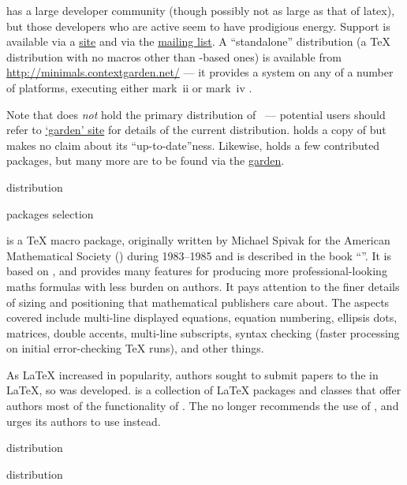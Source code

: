 \context{} has a large developer community (though possibly not as
large as that of latex{}), but those developers who are active seem to have
prodigious energy.  Support is available via a %
\href{http://wiki.contextgarden.net/Main_Page}{ site} and via the
\href{http://www.ntg.nl/mailman/listinfo/ntg-context}{mailing list}.
A ``standalone'' distribution (a \TeX{} distribution with no macros
other than \context{}-based ones) is available from
\url{http://minimals.contextgarden.net/} --- it provides
a \context{} system on any of a number of platforms, executing either
mark~ii or mark~iv \context{}.

Note that  does \emph{not} hold the primary distribution of
\context{}~--- potential users should refer to
\href{http://contextgarden.net}{\context{} `garden' site} for details
of the
current distribution.   holds a copy of \CONTeXT{} but
makes no claim about its ``up-to-date''ness.  Likewise, 
holds a few contributed \context{} packages, but many more are to be
found via the \href{http://contextgarden.net}{\CONTeXT{} garden}.
\begin{ctanrefs}
\item[\nothtml{\rmfamily}\CONTeXT{} distribution]
\item[\nothtml{\rmfamily}\CONTeXT{} packages selection]
\end{ctanrefs}


\AMSTeX{} is a \TeX{} macro package, originally written by Michael Spivak for
the American Mathematical Society () during 1983--1985 and
is described in the book ``''.
It is based on \plaintex{}, and provides many
features for producing more professional-looking maths formulas with
less burden on authors.  It pays attention to the finer details of
sizing and positioning that mathematical publishers care about. The
aspects covered include multi-line displayed equations, equation
numbering, ellipsis dots, matrices, double accents, multi-line
subscripts, syntax checking (faster processing on initial
error-checking \TeX{} runs), and other things.

As \LaTeX{} increased in popularity, authors sought to submit papers to
the  in \LaTeX{}, so \AMSLaTeX{} was developed.  \AMSLaTeX{}
is a collection of \LaTeX{} packages and classes that offer authors most of
the functionality of \AMSTeX{}.
The  no longer recommends the use of \AMSTeX{}, and urges
its authors to use \AMSLaTeX{} instead.
\begin{ctanrefs}
\item[\nothtml{\rmfamily}\AMSTeX{} distribution]
\item[\nothtml{\rmfamily}\AMSLaTeX{} distribution]
\end{ctanrefs}

